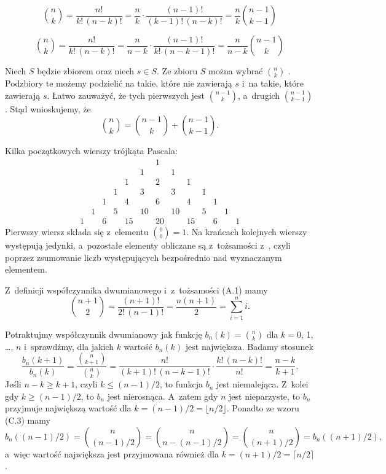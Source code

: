 \exercise %
\[
	\binom{n}{k} = \frac{n!}{k!\,(n-k)!} = \frac{n}{k}\cdot\frac{(n-1)!}{(k-1)!\,(n-k)!} = \frac{n}{k}\binom{n-1}{k-1}
\]

\exercise %
\[
	\binom{n}{k} = \frac{n!}{k!\,(n-k)!} = \frac{n}{n-k}\cdot\frac{(n-1)!}{k!\,(n-k-1)!} = \frac{n}{n-k}\binom{n-1}{k}
\]

\exercise %
Niech $S$ będzie zbiorem  oraz niech $s\in S$.
Ze zbioru $S$ można wybrać $\binom{n}{k}$ .
Podzbiory te możemy podzielić na takie, które nie zawierają $s$ i~na takie, które zawierają $s$.
Łatwo zauważyć, że tych pierwszych jest $\binom{n-1}{k}$, a~drugich $\binom{n-1}{k-1}$.
Stąd wnioskujemy, że
\[
    \binom{n}{k} = \binom{n-1}{k}+\binom{n-1}{k-1}.
\]

\exercise %
Kilka początkowych wierszy trójkąta Pascala:
\[
	\begin{array}{ccccccccccccc}
		&&&&&& 1 \\
		&&&&& 1 && 1 \\
		&&&& 1 && 2 && 1 \\
		&&& 1 && 3 && 3 && 1 \\
		&& 1 && 4 && 6 && 4 && 1 \\
		& 1 && 5 && 10 && 10 && 5 && 1 \\
		1 && 6 && 15 && 20 && 15 && 6 && 1
	\end{array}
\]
Pierwszy wiersz składa się z~elementu $\binom{0}{0}=1$.
Na krańcach kolejnych wierszy występują jedynki, a~pozostałe elementy obliczane są z~tożsamości z~, czyli poprzez zsumowanie liczb występujących bezpośrednio nad wyznaczanym elementem.

\exercise %
Z~definicji współczynnika dwumianowego i~z~tożsamości (A.1) mamy
\[
	\binom{n+1}{2} = \frac{(n+1)!}{2!\,(n-1)!} = \frac{n(n+1)}{2} = \sum_{i=1}^ni.
\]

\exercise %
Potraktujmy współczynnik dwumianowy jak funkcję $b_n(k)=\binom{n}{k}$ dla $k=0$, 1, \dots, $n$ i~sprawdźmy, dla jakich $k$ wartość $b_n(k)$ jest największa.
Badamy stosunek
\[
	\frac{b_n(k+1)}{b_n(k)} = \frac{\binom{n}{k+1}}{\binom{n}{k}} = \frac{n!}{(k+1)!\,(n-k-1)!}\cdot\frac{k!\,(n-k)!}{n!} = \frac{n-k}{k+1}.
\]
Jeśli $n-k\ge k+1$, czyli $k\le(n-1)/2$, to funkcja $b_n$ jest niemalejąca.
Z~kolei gdy $k\ge(n-1)/2$, to $b_n$ jest nierosnąca.
A~zatem gdy $n$ jest nieparzyste, to $b_n$ przyjmuje największą wartość dla $k=(n-1)/2=\lfloor n/2\rfloor$.
Ponadto ze wzoru (C.3) mamy
\[
    b_n((n-1)/2) = \binom{n}{(n-1)/2} = \binom{n}{n-(n-1)/2} = \binom{n}{(n+1)/2} = b_n((n+1)/2),
\]
a~więc wartość największa jest przyjmowana również dla $k=(n+1)/2=\lceil n/2\rceil$.

